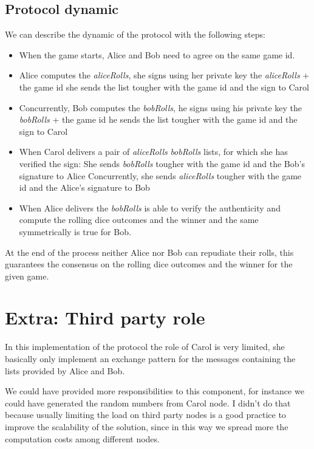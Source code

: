\documentclass{article}
\begin{document}
\subsection{Protocol dynamic}

We can describe the dynamic of the protocol with the following steps:

\begin{itemize}
	\item When the game starts, Alice and Bob need to agree on the same game id.
	\item Alice computes the \emph{aliceRolls},
		\subitem she signs using her private key the \emph{aliceRolls} + the game id
		\subitem she sends the list tougher with the game id and the sign to Carol
	\item Concurrently, Bob computes the \emph{bobRolls},
		\subitem he signs using his private key the \emph{bobRolls} + the game id
		\subitem he sends the list tougher with the game id and the sign to Carol
	\item When Carol delivers a pair of  \emph{aliceRolls} \emph{bobRolls} lists,
		for which she has verified the sign:
		\subitem She sends \emph{bobRolls} tougher with the game id and the Bob's signature to Alice
		\subitem  Concurrently, she sends \emph{aliceRolls} tougher with the game id and the Alice's signature to Bob
	\item When Alice delivers the \emph{bobRolls} is able to verify the authenticity and compute the rolling dice outcomes and the winner and the same symmetrically is true for Bob.
\end{itemize}

At the end of the process neither Alice nor Bob can repudiate their rolls, this guarantees 
the consensus on the rolling dice outcomes and the winner for the given game.

\section{Extra: Third party role}

In this implementation of the protocol the role of Carol is very limited,
she basically only implement an exchange pattern for the messages containing the lists 
provided by Alice and Bob.

We could have provided more responsibilities to this component,
for instance we could have generated the random numbers from Carol node.
I didn't do that because usually limiting the load on third party nodes is
a good practice to improve the scalability of the solution,
since in this way we spread more the computation costs among different nodes.
\end{document}
